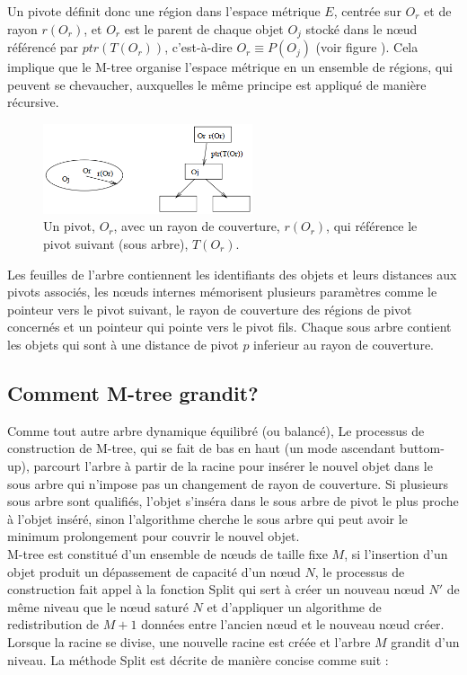 Un pivote définit donc une région dans l'espace métrique $ E $, centrée sur $ O_r $ et de rayon $ r(O_r) $, et $ O_r $ est le parent de chaque objet $ O_j $ stocké dans le nœud référencé par $ ptr(T(O_r)) $, c'est-à-dire $ O_r \equiv P(O_j)$ (voir figure ).  Cela implique que le M-tree organise l'espace métrique en un ensemble de régions, qui peuvent se chevaucher, auxquelles le même principe est appliqué de manière récursive.

\begin{figure}[H]
	\centering
	\includegraphics[width=0.55\textwidth]{Figures/mtree.png} %
	\caption{ Un pivot, $ O_r $, avec un rayon de couverture, $  r(O_r) $, qui référence le pivot suivant (sous arbre), $ T(O_r) $.}
\end{figure}

Les feuilles de l’arbre contiennent les identifiants des objets et leurs distances aux pivots associés, les nœuds internes mémorisent plusieurs paramètres comme le pointeur vers le pivot suivant, le rayon de couverture des régions de pivot concernés et un pointeur qui pointe vers le pivot fils. Chaque sous arbre contient les objets qui sont à une distance de pivot $ p $ inferieur au rayon de couverture.\\

\subsection{Comment M-tree grandit?}

Comme tout autre arbre dynamique équilibré (ou balancé), Le processus de construction de M-tree, qui se fait de bas en haut (un mode ascendant buttom-up), parcourt l'arbre à partir de la racine pour insérer le nouvel objet dans le sous arbre qui n'impose pas un changement de rayon de couverture. Si plusieurs sous arbre sont qualifiés, l'objet s'inséra dans le sous arbre de pivot le plus proche à l'objet inséré, sinon l'algorithme cherche le sous arbre qui peut avoir le minimum prolongement pour couvrir le nouvel objet.\\

M-tree est constitué d’un ensemble de nœuds de taille fixe $ M $, si l'insertion d'un objet produit un dépassement de capacité d'un nœud $ N $, le processus de construction fait appel à la fonction Split qui sert à créer un nouveau nœud $ N' $ de même niveau que le nœud saturé $ N  $ et d’appliquer un algorithme de redistribution de $ M+1 $ données entre l’ancien nœud et le nouveau nœud créer. Lorsque la racine se divise, une nouvelle racine est créée et l'arbre $ M $ grandit d'un niveau. La méthode Split est décrite de manière concise comme suit :\\

